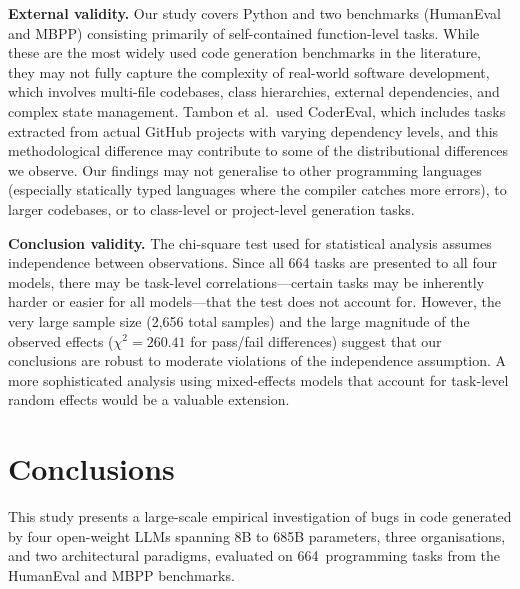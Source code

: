 \documentclass[smallextended]{svjour3}
\begin{document}
\textbf{External validity.} Our study covers Python and two benchmarks (HumanEval and MBPP) consisting primarily of self-contained function-level tasks. While these are the most widely used code generation benchmarks in the literature, they may not fully capture the complexity of real-world software development, which involves multi-file codebases, class hierarchies, external dependencies, and complex state management. Tambon et al.\ used CoderEval, which includes tasks extracted from actual GitHub projects with varying dependency levels, and this methodological difference may contribute to some of the distributional differences we observe. Our findings may not generalise to other programming languages (especially statically typed languages where the compiler catches more errors), to larger codebases, or to class-level or project-level generation tasks.

\textbf{Conclusion validity.} The chi-square test used for statistical analysis assumes independence between observations. Since all 664 tasks are presented to all four models, there may be task-level correlations---certain tasks may be inherently harder or easier for all models---that the test does not account for. However, the very large sample size (2,656 total samples) and the large magnitude of the observed effects ($\chi^2 = 260.41$ for pass/fail differences) suggest that our conclusions are robust to moderate violations of the independence assumption. A more sophisticated analysis using mixed-effects models that account for task-level random effects would be a valuable extension.

\section{Conclusions}
\label{sec:conclusions}

This study presents a large-scale empirical investigation of bugs in code generated by four open-weight LLMs spanning 8B to 685B parameters, three organisations, and two architectural paradigms, evaluated on 664~programming tasks from the HumanEval and MBPP benchmarks.
\end{document}
